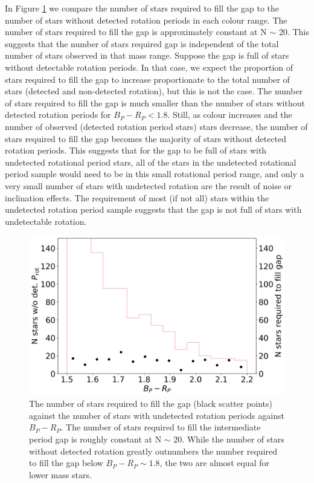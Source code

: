 In Figure \ref{fig:stars_not_fill} we compare the number of stars required to fill the gap to the number of stars without detected rotation periods in each colour range.
The number of stars required to fill the gap is approximately constant at N $\sim$ 20.
This suggests that the number of stars required gap is independent of the total number of stars observed in that mass range.
Suppose the gap is full of stars without detectable rotation periods.
In that case, we expect the proportion of stars required to fill the gap to increase proportionate to the total number of stars (detected and non-detected rotation), but this is not the case.
The number of stars required to fill the gap is much smaller than the number of stars without detected rotation periods for $B_P-R_P<1.8$. 
Still, as colour increases and the number of observed (detected rotation period stars) stars decrease, the number of stars required to fill the gap becomes the majority of stars without detected rotation periods.
This suggests that for the gap to be full of stars with undetected rotational period stars, all of the stars in the undetected rotational period sample would need to be in this small rotational period range, and only a very small number of stars with undetected rotation are the result of noise or inclination effects.
The requirement of most (if not all) stars within the undetected rotation period sample suggests that the gap is not full of stars with undetectable rotation.

\begin{figure}
\centering
  \includegraphics[width=\textwidth]{Figures/rot_gap_figures/stars_donot_fullgap.png}
  \caption[The number of stars required to fill the gap (black scatter points) against the number of stars with undetected rotation periods against $B_P-R_P$.]{
  	The number of stars required to fill the gap (black scatter points) against the number of stars with undetected rotation periods against $B_P-R_P$. The number of stars required to fill the intermediate period gap is roughly constant at N $\sim$ 20. While the number of stars without detected rotation greatly outnumbers the number required to fill the gap below $B_P-R_P \sim 1.8$, the two are almost equal for lower mass stars.
}
  \label{fig:stars_not_fill}
\end{figure}


